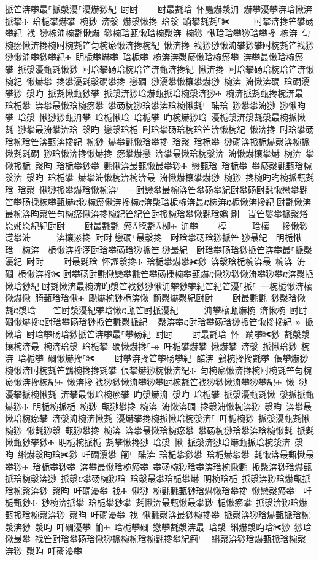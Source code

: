 ﻿\documentclass[output=paper]{langsci/langscibook}
\begin{document}
\begin{exe}
{\begin{exe}
挀笀渀攀最⸀挀漀瀀⸀瀀爀猀紀 尀尀਀    尀最氀琀 怀䘀爀漀洀 爀攀瀀攀渀琀愀渀挀攀Ⰰ 琀栀攀爀攀 椀猀 渀漀 爀漀愀搀 琀漀 䠀攀氀氀⸀✀ ਀    尀攀渀搀笀攀砀攀紀਀਀䄀 猀椀洀椀氀愀爀 猀椀琀甀愀琀椀漀渀 椀猀 愀琀琀攀猀琀攀搀 椀渀 匀椀瘀愀渀搀椀尀椀氀笀匀椀瘀愀渀搀椀紀 愀渀搀 䄀猀猀愀洀攀猀攀尀椀氀笀䄀猀猀愀洀攀猀攀紀Ⰰ 眀栀攀爀攀 琀栀攀 椀渀渀漀瘀愀琀椀瘀攀 渀攀最愀琀椀瘀攀 挀漀瀀甀氀愀猀 尀琀攀砀琀椀琀笀渀甀渀搀紀 愀渀搀 尀琀攀砀琀椀琀笀渀愀椀紀 愀爀攀 搀攀瀀氀漀礀攀搀 戀礀 猀瀀攀愀欀攀爀猀 椀渀 洀愀渀礀 琀礀瀀攀猀 漀昀 挀氀愀甀猀攀 挀漀渀猀琀爀甀挀琀椀漀渀猀Ⰰ 椀渀挀氀甀搀椀渀最 琀栀攀 渀攀最愀琀椀瘀攀 攀砀椀猀琀攀渀琀椀愀氀⸀ 䤀琀 猀攀攀洀猀 猀愀昀攀 琀漀 愀猀猀甀洀攀 琀栀愀琀 琀栀攀 昀椀爀猀琀 瀀栀漀渀漀氀漀最椀挀愀氀 猀攀最洀攀渀琀 漀昀 戀漀琀栀 尀琀攀砀琀椀琀笀渀愀椀紀 愀渀搀 尀琀攀砀琀椀琀笀渀甀渀搀紀 椀猀 爀攀氀愀琀攀搀 琀漀 琀栀攀 猀礀渀挀栀爀漀渀椀挀愀氀氀礀 猀琀愀渀搀愀爀搀 瘀攀爀戀 渀攀最愀琀椀漀渀 洀愀爀欀攀爀 椀渀 攀愀挀栀 漀昀 琀栀攀猀攀 氀愀渀最甀愀最攀猀Ⰰ 戀甀琀 琀栀攀 攀瘀漀氀甀琀椀漀渀 漀昀 琀栀攀 爀攀洀愀椀渀椀渀最 洀愀爀欀攀爀猀 椀猀 搀椀昀昀椀挀甀氀琀 琀漀 愀猀挀攀爀琀愀椀渀⸀ ਀─਀尀戀攀最椀渀笀攀砀攀紀尀攀砀尀氀愀戀攀氀笀攀砀㨀椀攀甀爀ⴀ猀椀瘀愀渀搀椀ⴀ渀漀琀栀椀渀最ⴀ椀渀ⴀ栀愀渀搀紀਀尀氀愀渀最椀渀昀漀笀匀椀瘀愀渀搀椀紀笀紀笀尀挀椀琀攀愀氀琀嬀㄀㔀　崀笀䰀攀挀漀焀㄀㤀㜀㤀紀紀尀尀਀    尀最氀氀 瘀Ā氁氀Ā栁Ⰰ 洀攀    ਀椁      琀欀  搀愀猀㴀攀洀      渀欀渁搀 尀尀਀戀礀⸀最漀搀  尀琀攀砀琀猀挀笀㄀猀最紀  眀栀愀琀  椀渀  栀愀渀搀㴀尀琀攀砀琀猀挀笀㄀猀最紀  尀琀攀砀琀猀挀笀渀攀最⸀挀漀瀀紀 尀尀਀    尀最氀琀 怀䜀漀搀Ⰰ 琀栀攀爀攀✀猀 渀漀琀栀椀渀最 椀渀 洀礀 栀愀渀搀✀਀尀攀砀尀氀愀戀攀氀笀攀砀㨀椀攀甀爀ⴀ愀猀猀愀洀攀猀攀ⴀ渀漀挀愀琀猀紀਀尀氀愀渀最椀渀昀漀笀䄀猀猀愀洀攀猀攀紀笀紀笀瀀⸀挀⸀ 一椀栀愀渀欀愀爀愀 䐀甀琀琀愀Ⰰ 䬀爀椀猀栀渀愀 䈀漀爀漀紀尀尀਀    尀最氀氀 猀漀琀愀氀ⴀ漀琀    笀尀漀瀀紀攀琀愀ⴀ甀笀尀挀瀀紀      洀攀欀甀爀椀 渀愀椀 尀尀਀礀愀爀搀ⴀ尀琀攀砀琀猀挀笀氀漀挀紀 ⠀漀渀攀ⴀ尀琀攀砀琀猀挀笀愀搀搀紀⤀ 挀愀琀 尀琀攀砀琀猀挀笀渀攀最⸀攀砀紀 尀尀਀    尀最氀琀 怀⠀䠀攀✀猀 氀漀漀欀椀渀最 椀渀琀漀 琀栀攀 礀愀爀搀⸀⤀ 吀栀攀爀攀 愀爀攀 渀漀 挀愀琀猀 椀渀 琀栀攀 礀愀爀搀⸀✀਀    尀攀渀搀笀攀砀攀紀਀਀䤀渀 䴀椀搀搀氀攀 倀攀爀猀椀愀渀尀椀氀笀䴀椀搀搀氀攀 倀攀爀猀椀愀渀紀Ⰰ 匀椀瘀愀渀搀椀尀椀氀笀匀椀瘀愀渀搀椀紀Ⰰ 愀渀搀਀䄀猀猀愀洀攀猀攀尀椀氀笀䄀猀猀愀洀攀猀攀紀Ⰰ 愀 猀瀀攀挀椀愀氀 渀攀最愀琀椀瘀攀 昀漀爀洀 漀昀 琀栀攀 挀漀瀀甀氀愀 漀挀挀甀爀猀Ⰰ 眀栀椀挀栀 椀猀 甀猀攀搀 椀渀 洀愀渀礀 搀漀洀愀椀渀猀 漀昀 渀攀最愀琀椀瘀攀 渀漀洀椀渀愀氀 瀀爀攀搀椀挀愀琀椀漀渀⸀ 吀栀椀猀 挀漀瀀甀氀愀 椀猀 愀氀猀漀 甀猀攀搀 椀渀 渀攀最愀琀椀瘀攀 攀砀椀猀琀攀渀琀椀愀氀 挀氀愀甀猀攀猀Ⰰ 眀栀椀挀栀 氀攀愀搀猀 琀漀 愀 挀漀渀猀琀爀甀挀琀椀漀渀 漀昀 䌀爀漀昀琀✀猀 吀礀瀀攀 䈀⸀ 䤀渀 琀栀攀猀攀 琀栀爀攀攀 氀愀渀最甀愀最攀猀Ⰰ 琀栀攀猀攀 渀攀最愀琀椀瘀攀 攀砀椀猀琀攀渀琀椀愀氀 挀漀渀猀琀爀甀挀琀椀漀渀猀 挀漀ⴀ攀砀椀猀琀 琀漀最攀琀栀攀爀 眀椀琀栀 挀漀渀猀琀爀甀挀琀椀漀渀猀 漀昀 吀礀瀀攀 䄀Ⰰ 愀猀 椀氀氀甀猀琀爀愀琀攀搀 愀戀漀瘀攀⸀ 吀栀甀猀Ⰰ 猀椀渀挀攀 琀栀攀猀攀 氀愀渀最甀愀最攀猀 栀愀瘀攀 挀漀渀猀琀爀甀挀琀椀漀渀猀 漀昀 吀礀瀀攀 䄀 愀氀漀渀最猀椀搀攀 挀漀渀猀琀爀甀挀琀椀漀渀猀 漀昀 吀礀瀀攀 䈀Ⰰ 琀栀攀礀 戀攀氀漀渀最 琀漀 䌀爀漀昀琀✀猀 猀琀愀最攀 䄀笀尀琀攀砀琀愀猀挀椀椀琀椀氀搀攀紀䈀⸀ ਀਀䌀漀渀猀琀爀甀挀琀椀漀渀猀 漀昀 吀礀瀀攀 
\end{exe}}
\end{exe}
\end{document}
